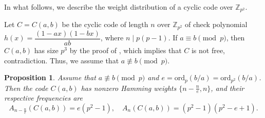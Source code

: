\documentclass[12pt,reqno]{amsart}
\newtheorem{prop}{Proposition}
\begin{document}
\begin{table}[htbp]
{\begin{tabular}{lllll}



	\end{tabular}
}
\end{table}


In what follows, we describe the weight distribution of a cyclic code over  $\mathbb{Z}_{p^2}$.

Let $C = C(a,b)$ be the cyclic code of length $n$ over $\mathbb{Z}_{p^2}$ of check polynomial $h(x) = \dfrac{(1-ax)(1-bx)}{ab}$, where $n \mid p(p-1)$.
If $a \equiv b \pmod{p}$, then $C(a,b)$ has size $p^3$ by the proof of \cite[Theorem 2]{SHS},
which implies that $C$ is not free, contradiction.
Thus, we assume that $a \not\equiv b \pmod{p}$.
\begin{prop}\cite[Theorem 1]{SHS}
	Assume that $a \not\equiv b \pmod{p}$ and $e = \mathrm{ord}_p (b/a) = \mathrm{ord}_{p^2} (b/a)$.
	Then the code $C(a,b)$ has nonzero Hamming weights $\{n - \frac{n}{e}, n\}$, and their respective frequencies are
	\[ A_{n-\frac{n}{e}}(C(a,b)) = e(p^2 - 1), \quad A_n(C(a,b)) = (p^2 - 1)(p^2 - e + 1). \]
\end{prop}
\end{document}
